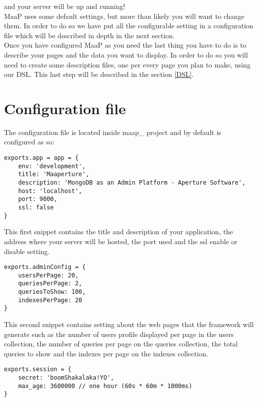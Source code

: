 and your server will be up and running!\\

MaaP uses some default settings, but more than likely you will want to change them. In order to do so we have put all the configurable setting in a configuration file which will be described in depth in the next section.\\

Once you have configured MaaP as you need the last thing you have to do is to describe your pages and the data you want to display.
In order to do so you will need to create some description files, one per every page you plan to make, using our DSL.
This last step will be described in the section \ref{DSL}.\\




\newpage
\section{Configuration file}

The configuration file is located inside   maap\_ project and by default is configured as so:\\


\begin{lstlisting}
exports.app = app = {
	env: 'development',
	title: 'Maaperture',
	description: 'MongoDB as an Admin Platform - Aperture Software',
	host: 'localhost',
	port: 9000,
	ssl: false
}

\end{lstlisting}

This first snippet contains the title and description of your application, the address where your server will be hosted, the port used and the ssl enable or disable setting.\\

\begin{lstlisting}
exports.adminConfig = {
	usersPerPage: 20,
	queriesPerPage: 2,
	queriesToShow: 100,
	indexesPerPage: 20
}
\end{lstlisting}

This second snippet contains setting about the web pages that the framework will generate such as the number of users profile displayed per page in the users collection, the number of queries per page on the queries collection, the total queries to show and the indexes per page on the indexes collection.\\

\begin{lstlisting}
exports.session = {
	secret: 'boomShakalaka!YO',
	max_age: 3600000 // one hour (60s * 60m * 1000ms)
}
\end{lstlisting}

